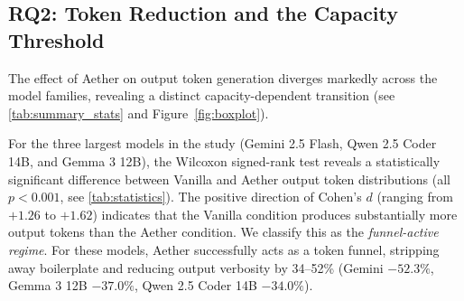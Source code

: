 \documentclass[review,12pt,3p]{elsarticle}
\begin{document}
\begin{table}[htbp]
\centering
\caption{Hypothesis testing and effect size measures comparing prompt-level average output token length under Aether vs. Vanilla, ordered descending by model parameters. Significant models (\(p < 0.05\)) are highlighted in green, non-significant in grey.}
\label{tab:statistics}
\end{table}


\subsection{RQ2: Token Reduction and the Capacity Threshold}

The effect of Aether on output token generation diverges markedly across the model
families, revealing a distinct capacity-dependent transition (see \cref{tab:summary_stats} and Figure~\ref{fig:boxplot}).

For the three largest models in the study (Gemini 2.5 Flash, Qwen 2.5 Coder 14B, and Gemma 3 12B),
the Wilcoxon signed-rank test reveals a statistically significant difference between Vanilla
and Aether output token distributions (all $p < 0.001$, see \cref{tab:statistics}). The positive direction
of Cohen's $d$ (ranging from $+1.26$ to $+1.62$) indicates that the Vanilla condition
produces substantially more output tokens than the Aether condition. We classify this as the
\emph{funnel-active regime}. For these models, Aether successfully acts as a token funnel,
stripping away boilerplate and reducing output verbosity by 34--52\% (Gemini $-52.3\%$, Gemma 3 12B $-37.0\%$, Qwen 2.5 Coder 14B $-34.0\%$). 
\end{document}
